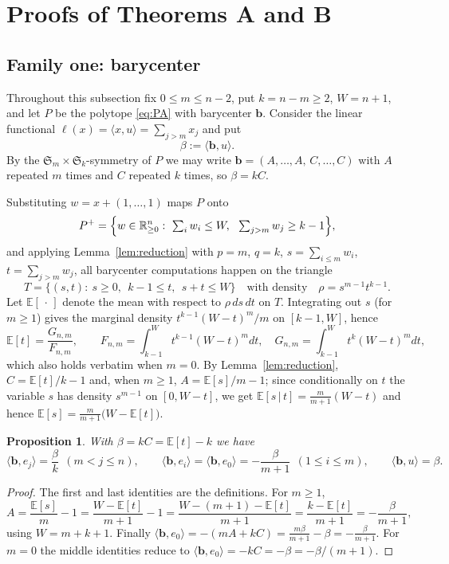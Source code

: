 \documentclass[11pt]{amsart}
\newtheorem{proposition}[theorem]{Proposition}
\theoremstyle{definition}
\theoremstyle{remark}
\newcommand{\RR}{\mathbb{R}}
\begin{document}
\section{Proofs of Theorems A and B}\label{sec:proofAB}

\subsection{Family one: barycenter}\label{subsec:proofA}
Throughout this subsection fix $0\le m\le n-2$, put $k=n-m\ge2$,
$W=n+1$, and let $P$ be the polytope \eqref{eq:PA} with barycenter
$\mathbf b$. Consider the linear functional
$\ell(x)=\langle x,u\rangle=\sum_{j>m}x_j$ and put
\[
\beta:=\langle\mathbf b,u\rangle .
\]
By the $\mathfrak S_m\times\mathfrak S_k$-symmetry of $P$ we may write
$\mathbf b=(A,\dots,A,\,C,\dots,C)$ with $A$ repeated $m$ times and
$C$ repeated $k$ times, so $\beta=kC$.

Substituting $w=x+(1,\dots,1)$ maps $P$ onto
\[
P^+=\Bigl\{w\in\RR^n_{\ge0}:\ \textstyle\sum_i w_i\le W,\ \ 
\textstyle\sum_{j>m}w_j\ge k-1\Bigr\},
\]
and applying Lemma~\ref{lem:reduction} with $p=m$, $q=k$,
$s=\sum_{i\le m}w_i$, $t=\sum_{j>m}w_j$, all barycenter computations
happen on the triangle
\[
T=\{(s,t):\ s\ge0,\ \ k-1\le t,\ \ s+t\le W\}
\quad\text{with density}\quad \rho=s^{m-1}t^{k-1} .
\]
Let $\mathbb E[\,\cdot\,]$ denote the mean with respect to
$\rho\,ds\,dt$ on $T$. Integrating out $s$ (for $m \ge 1$) gives the
marginal density $t^{k-1}(W-t)^m/m$ on $[k-1,W]$, hence
\begin{equation}\label{eq:Et}
\mathbb E[t]=\frac{G_{n,m}}{F_{n,m}},
\qquad
F_{n,m}=\int_{k-1}^{W}t^{k-1}(W-t)^m dt,\quad
G_{n,m}=\int_{k-1}^{W}t^{k}(W-t)^m dt,
\end{equation}
which also holds verbatim when $m=0$. By Lemma~\ref{lem:reduction},
$C=\mathbb E[t]/k-1$ and, when $m\ge1$, $A=\mathbb E[s]/m-1$; since
conditionally on $t$ the variable $s$ has density $s^{m-1}$ on
$[0,W-t]$, we get $\mathbb E[s\,|\,t]=\tfrac{m}{m+1}(W-t)$ and hence
$\mathbb E[s]=\tfrac{m}{m+1}\bigl(W-\mathbb E[t]\bigr)$.

\begin{proposition}\label{prop:pairings}
With $\beta=kC=\mathbb E[t]-k$ we have
\[
\langle\mathbf b,e_j\rangle=\frac{\beta}{k}\ \ (m<j\le n),
\qquad
\langle\mathbf b,e_i\rangle=\langle\mathbf b,e_0\rangle
=-\frac{\beta}{m+1}\ \ (1\le i\le m),
\qquad
\langle\mathbf b,u\rangle=\beta .
\]
\end{proposition}

\begin{proof}
The first and last identities are the definitions. For $m\ge1$,
\[
A=\frac{\mathbb E[s]}{m}-1
=\frac{W-\mathbb E[t]}{m+1}-1
=\frac{W-(m+1)-\mathbb E[t]}{m+1}
=\frac{k-\mathbb E[t]}{m+1}=-\frac{\beta}{m+1},
\]
using $W=m+k+1$. Finally
$\langle\mathbf b,e_0\rangle=-(mA+kC)
=\tfrac{m\beta}{m+1}-\beta=-\tfrac{\beta}{m+1}$.
For $m=0$ the middle identities reduce to
$\langle\mathbf b,e_0\rangle=-kC=-\beta=-\beta/(m+1)$.
\end{proof}
\end{document}
